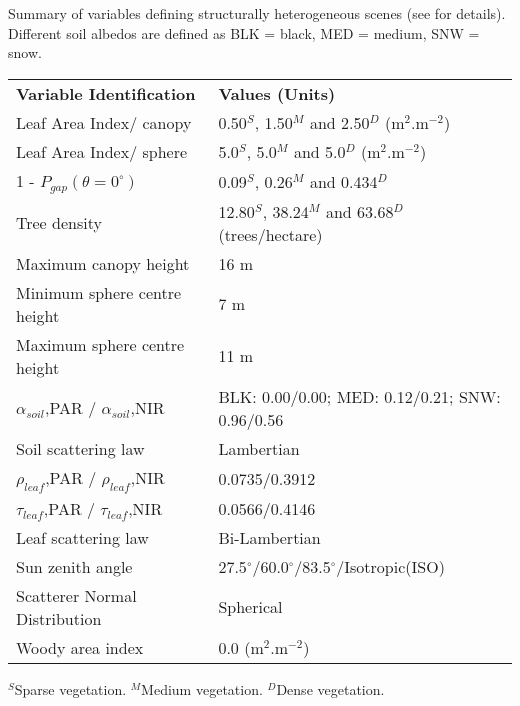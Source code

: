 \begin{threeparttable}
\centering
\caption{Summary of variables defining structurally heterogeneous scenes (see \citet{Widlowski2011} for details). Different soil albedos are defined as BLK = black, MED = medium, SNW = snow.}
\begin{tabular}{l{} l{}}
     \hline
     \hline
\textbf{Variable Identification}   & \textbf{Values (Units)}\\
\noalign{\smallskip}\hline
Leaf Area Index/ canopy	                & 0.50$^S$, 1.50$^M$ and 2.50$^D$ (m$^2$.m$^{-2}$)\\
Leaf Area Index/ sphere	                & 5.0$^S$, 5.0$^M$ and 5.0$^D$  (m$^2$.m$^{-2}$)\\
1 - $P_{gap} (\theta = 0^{\circ})$      & 0.09$^S$, 0.26$^M$ and 0.434$^D$\\
Tree density                            & 12.80$^S$, 38.24$^M$ and 63.68$^D$ (trees/hectare)\\
Maximum canopy height                   & 16 m\\
Minimum sphere centre height	        & 7 m\\
Maximum sphere centre height	        & 11 m\\
$\alpha_{soil}$,PAR / $\alpha_{soil}$,NIR	& BLK: 0.00/0.00; MED: 0.12/0.21; SNW: 0.96/0.56\\
Soil scattering law	                & Lambertian\\
$\rho_{leaf}$,PAR / $\rho_{leaf}$,NIR     & 0.0735/0.3912\\
$\tau_{leaf}$,PAR / $\tau_{leaf}$,NIR     & 0.0566/0.4146\\
Leaf scattering law                     & Bi-Lambertian\\
Sun zenith angle	                & 27.5$^{\circ}$/60.0$^{\circ}$/83.5$^{\circ}$/Isotropic(ISO)\\
Scatterer Normal Distribution           & Spherical\\
Woody area index                        & 0.0 (m$^2$.m$^{-2}$)\\
\hline
\hline%
\end{tabular}
\begin{tablenotes}
      \small
      \item $^S$Sparse vegetation. $^M$Medium vegetation. $^D$Dense vegetation. 
\end{tablenotes}
\label{tab:RAMI4PILPS}
\end{threeparttable}
\bigskip

